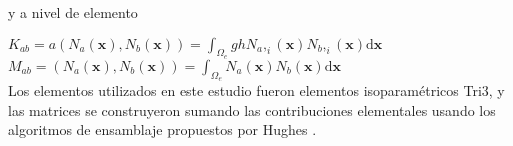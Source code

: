 y a  nivel de elemento

$K_{ab} = a(N_a(\boldsymbol{x}), N_b(\boldsymbol{x})) = \int_{\Omega_e} gh N_a,_i(\boldsymbol{x}) N_b,_i(\boldsymbol{x}) \mathrm{d}\boldsymbol{x} $\\

$M_{ab} = (N_a(\boldsymbol{x}), N_b(\boldsymbol{x})) = \int_{\Omega_e} N_a(\boldsymbol{x}) N_b(\boldsymbol{x}) \mathrm{d}\boldsymbol{x} $\\

Los elementos utilizados en este estudio fueron elementos isoparam\'etricos Tri3, y las matrices se construyeron sumando las contribuciones elementales usando los algoritmos de ensamblaje propuestos por Hughes \cite{hughes2000}.






